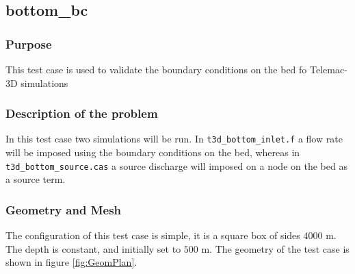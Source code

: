 \subsection{bottom\_bc}%
%

%
\subsubsection{Purpose}
%
This test case is used to validate the boundary conditions on the bed fo Telemac-3D simulations
%
\subsubsection{Description of the problem}
%
In this test case two simulations will be run. In \texttt{t3d\_bottom\_inlet.f} a flow rate will be imposed using the boundary conditions on the bed, whereas in \texttt{t3d\_bottom\_source.cas} a source discharge will imposed on a node on the bed as a source term.


%

%
%
\subsubsection{Geometry and Mesh}
%
The configuration of this test case is simple, it is a square box of sides $4000$ m. The depth is constant, and initially set to $500$ m. The geometry of the test case is shown in figure \ref{fig:GeomPlan}.


